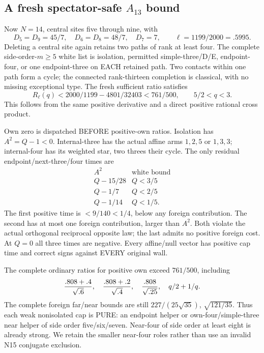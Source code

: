 \subsection{A fresh spectator-safe \(A_{13}\) bound}
\label{app:arithA13universal}

Now \(N=14\), central sites five through nine,
with
\[
 D_5=D_9=45/7,\quad D_6=D_8=48/7,\quad D_7=7,\qquad
 \ell=1199/2000=.5995 .
\]
Deleting a central site again retains two
paths of rank at least four.
The complete side-order-\(m\ge5\) white list
is isolation, permitted simple-three/D/E,
endpoint-four, or one endpoint-three on EACH
retained path.
Two contacts within one path form a cycle;
the connected rank-thirteen completion is
classical, with no missing exceptional type.
The fresh sufficient ratio satisfies
\[
 R_\ell(q)<2000/1199-4801/32403<761/500,\qquad 5/2<q<3 .
\]
This follows from the same positive derivative
and a direct positive rational cross product.

Own zero is dispatched BEFORE positive-own
ratios.
Isolation has \(A^2=Q-1<0\).
Internal-three has the actual affine arms
\(1,2,5\) or \(1,3,3\); internal-four has its
weighted star, two threes their cycle.
The only residual endpoint/next-three/four
times are
\[
 \begin{array}{c|c}
 A^2&\text{white bound}\\ \hline
 Q-15/28&Q<3/5\\
 Q-1/7&Q<2/5\\
 Q-1/14&Q<1/5 .
 \end{array}
\]
The first positive time is \(<9/140<1/4\),
below any foreign contribution.
The second has at most one foreign contribution,
larger than \(A^2\).
Both violate the actual orthogonal reciprocal
opposite law; the last admits no positive
foreign cost.
At \(Q=0\) all three times are negative.
Every affine/null vector has positive cap time
and correct signs against EVERY original wall.

The complete ordinary ratios for positive own
exceed \(761/500\), including
\[
 { .808+.4\over\sqrt{.6}},\quad
 { .808+.2\over\sqrt{.4}},\quad
 { .808\over\sqrt{.25}},\quad q/2+1/q .
\]
The complete foreign far/near bounds are still
\(227/(25\sqrt{35})\), \(\sqrt{121/35}\).
Thus each weak nonisolated cap is PURE:
an endpoint helper or own-four/simple-three
near helper of side order five/six/seven.
Near-four of side order at least eight is
already strong.
We retain the smaller near-four roles rather
than use an invalid N15 conjugate exclusion.

